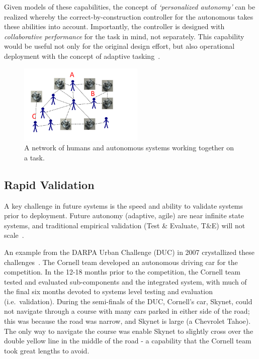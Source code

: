 Given models of these capabilities, the concept of {\it `personalized autonomy'} can be realized whereby the correct-by-construction controller for the autonomous takes these abilities into account. Importantly, the controller is designed with {\it collaborative performance} for the task in mind, not separately. This capability would be useful not only for the original design effort, but also operational deployment with the concept of adaptive tasking~\cite{parasuraman2009adaptive}.

\begin{figure}[h] %
   \centering
   \includegraphics[height=1.5in]{collaboration.pdf} 
   \caption{A network of humans and autonomous systems working together on a task.}
   \label{fig:collaboration}
\end{figure}



\subsection*{Rapid Validation}

A key challenge in future systems is the speed and ability to validate systems prior to deployment. Future autonomy (adaptive, agile) are near infinite state systems, and traditional empirical validation (Test \& Evaluate, T\&E) will not scale~\cite{tech-horizons2011}. 

An example from the DARPA Urban Challenge (DUC) in 2007 crystallized these challenges~\cite{Campbell2010e,Miller2008}. The Cornell team developed an autonomous driving car for the competition. In the 12-18 months prior to the competition, the Cornell team tested and evaluated sub-components and the integrated system, with much of the final six months devoted to systems level testing and evaluation (i.e.\ validation). During the semi-finals of the DUC, Cornell's car, Skynet, could not navigate through a course with many cars parked in either side of the road; this was because the road was narrow, and Skynet is large (a Chevrolet Tahoe). The only way to navigate the course was enable Skynet to slightly cross over the double yellow line in the middle of the road - a capability that the Cornell team took great lengths to avoid. 

